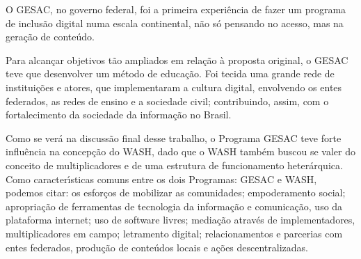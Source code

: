 \documentclass[
12pt,		%
openright,	%
twoside,  %
a4paper,			%
chapter=TITLE,		%
english,			%
french,				%
spanish,			%
brazil				%
]{USPSC-classe/USPSC}
\begin{document}
O GESAC, no governo federal, foi a primeira experi\^encia de fazer um programa de inclus\~ao digital numa escala continental, n\~ao s\'o pensando no acesso, mas na gera\c{c}\~ao de conte\'udo.










\noindent\begin{center}\mbox{\centering{}}\end{center}


Para alcan\c{c}ar objetivos t\~ao ampliados em rela\c{c}\~ao \`a proposta original, o GESAC teve que desenvolver um m\'etodo de educa\c{c}\~ao. Foi tecida uma grande rede de institui\c{c}\~oes e atores, que  implementaram  a cultura digital, envolvendo os entes federados, as redes de ensino  e a sociedade civil;  contribuindo, assim, com o fortalecimento da sociedade da informa\c{c}\~ao no Brasil.










\noindent\begin{center}\mbox{\centering{}}\end{center}


Como se ver\'a na discuss\~ao final desse trabalho, o Programa GESAC teve forte influ\^encia na concep\c{c}\~ao do WASH, dado que o WASH tamb\'em buscou se valer do conceito de multiplicadores e de uma estrutura de funcionamento heter\'arquica. Como caracter\'{\i}sticas comuns entre os dois Programas: GESAC e WASH, podemos citar:  os esfor\c{c}os de mobilizar as comunidades; empoderamento social; apropria\c{c}\~ao de ferramentas de tecnologia da informa\c{c}\~ao e comunica\c{c}\~ao, uso da plataforma internet; uso de software livres; media\c{c}\~ao atrav\'es de implementadores, multiplicadores em campo; letramento digital; relacionamentos e parcerias com entes federados, produ\c{c}\~ao de conte\'udos locais e a\c{c}\~oes descentralizadas.
\end{document}
